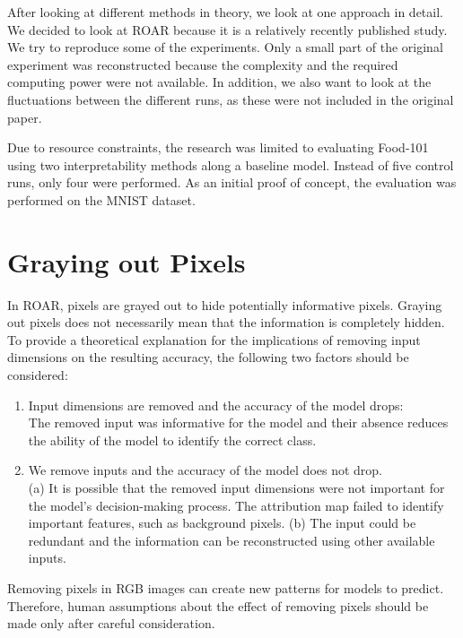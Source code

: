 After looking at different methods in theory, we look at one approach in detail. We decided to look at ROAR\cite{hooker2019benchmark} because it is a relatively recently published study. We try to reproduce some of the experiments. Only a small part of the original experiment was reconstructed because the complexity and the required computing power were not available. In addition, we also want to look at the fluctuations between the different runs, as these were not included in the original paper.


Due to resource constraints, the research was limited to evaluating Food-101 \cite{bossard14} using two interpretability methods along a baseline model. Instead of five control runs, only four were performed. As an initial proof of concept, the evaluation was performed on the MNIST dataset\cite{deng2012mnist}.


\section{Graying out Pixels}
\label{gray}
In ROAR, pixels are grayed out to hide potentially informative pixels. Graying out pixels does not necessarily mean that the information is completely hidden. To provide a theoretical explanation for the implications of removing input dimensions on the resulting accuracy, the following two factors\cite{hooker2019benchmark} should be considered:

\begin{enumerate}
	\item Input dimensions are removed and the accuracy of the model drops:\\ The removed input was informative for the model and their absence reduces the ability of the model to identify the correct class.
	
	\item We remove inputs and the accuracy of the model does not drop.\\ (a) It is possible that the removed input dimensions were not important for the model’s decision-making process. The attribution map failed to identify important features, such as background pixels. (b) The input could be redundant and the information can be reconstructed using other available inputs. 
\end{enumerate}

Removing pixels in RGB images can create new patterns for models to predict. Therefore, human assumptions about the effect of removing pixels should be made only after careful consideration.


